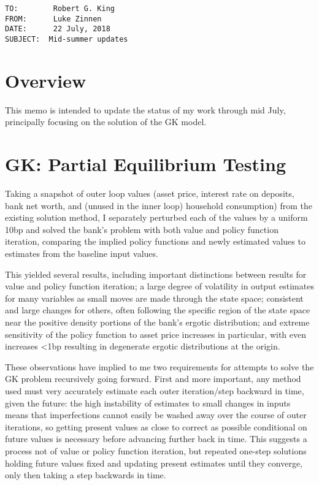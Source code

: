 \documentclass[english]{article}
\begin{document}
\begin{verbatim}
TO:        Robert G. King
FROM:      Luke Zinnen
DATE:      22 July, 2018
SUBJECT:  Mid-summer updates
\end{verbatim}

\section{Overview}
This memo is intended to update the status of my work through mid July, principally focusing 
on the solution of the GK model.

\section{GK: Partial Equilibrium Testing}
Taking a snapshot of outer loop values (asset price, interest rate on deposits, bank net worth, and (unused in the inner loop) household 
consumption) from the existing solution method, I separately  perturbed each of the values by a uniform 
10bp and solved the bank's problem with both value and policy function iteration, comparing the implied 
policy functions and newly estimated values to estimates from the baseline input values. 

This yielded several results, including important distinctions between results for value and policy 
function iteration; a large degree of volatility in output estimates for many variables as small moves are 
made through the state space; consistent and large changes for others, often following the specific 
region of the state space near the positive density portions of the bank's ergotic distribution; and extreme 
sensitivity of the policy function to asset price increases in particular, with even increases <1bp 
resulting in degenerate ergotic distributions at the origin.

These observations have implied to me two requirements for attempts to solve the GK problem recursively 
going forward. First and more important, any method used must very accurately estimate each outer 
iteration/step backward in time, given the future: the high instability of estimates to small changes in 
inputs means that imperfections cannot easily be washed away over the course of outer iterations, so 
getting present values as close to correct as possible conditional on future values is necessary before 
advancing further back in time. This suggests a process not of value or policy function iteration, but 
repeated one-step solutions holding future values fixed and updating present estimates until they converge, 
only then taking a step backwards in time. 
\end{document}
